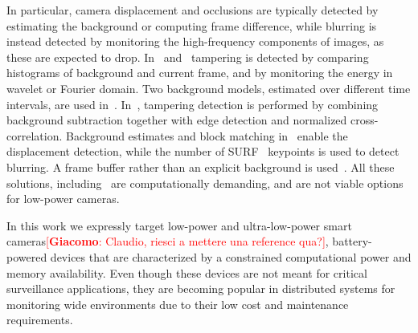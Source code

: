 \documentclass{llncs}
\newcommand{\gi}[1]{{\textcolor{red}{[\small \textbf{Giacomo}: #1]}}}
\begin{document}
In particular, camera displacement and occlusions are typically detected by estimating the background or computing frame difference, while blurring is instead detected by monitoring the high-frequency components of images, as these are expected to drop. In~\cite{aksay2007camera} and~\cite{saglam2009real} tampering is detected by comparing histograms of background and current frame, and by monitoring the energy in wavelet or Fourier domain. Two background models, estimated over different time intervals, are used in~\cite{saglam2009real}. In~\cite{gil2007automatic}, tampering detection is performed by combining background subtraction together with edge detection and normalized cross-correlation. Background estimates and block matching in~\cite{tsesmelis2013tamper} enable the displacement detection, while the number of SURF~\cite{bay2006surf} keypoints is used to detect blurring. A frame buffer rather than an explicit background is used~\cite{ribnick2006real}. All these solutions, including~\cite{harasse2004automated,kryjak2012fpga} are computationally demanding, and are not viable options for low-power cameras. 

In this work we expressly target low-power and ultra-low-power smart cameras\gi{Claudio, riesci a mettere una reference qua?}, battery-powered devices that are characterized by a constrained computational power and memory availability. Even though these devices are not meant for critical surveillance applications, they are becoming popular in distributed systems for monitoring wide environments due to their low cost and maintenance requirements.  %
\end{document}
